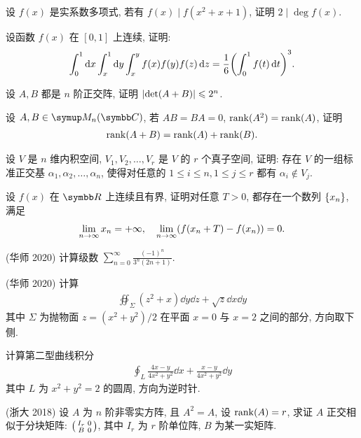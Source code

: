 \documentclass{ctexart}
\begin{document}
\begin{exercise}[resume=exer]
\begin{exercise}
        \end{exercise}
        \item 设 $ f(x) $ 是实系数多项式, 若有 $ f(x) \mid f(x^2 + x + 1) $, 证明 $ 2 \mid \deg f(x) $.
        \item 设函数 $ f(x) $ 在 $ [0, 1] $ 上连续, 证明:
        \begin{align*}
            \int_{0}^{1} \dd{x}\int_{x}^{1} \dd{y}\int_{x}^{y}f(x)f(y)f(z)\dd{z} = \frac{1}{6}\qty(\int_{0}^{1}f(t) \dd{t})^{3}.
        \end{align*}
        \item 设 $ A, B $ 都是 $ n $ 阶正交阵, 证明 $ \abs{\det(A+B)} \leqslant 2^{n} $.
        \item 设 $ A, B \in \MM[\C] $, 若 $ AB = BA = 0 $, $ \rank(A^{2}) = \rank(A) $, 证明
        \begin{align*}
            \rank(A+B) = \rank(A) + \rank(B).
        \end{align*}
        \item 设 $ V $ 是 $ n $ 维内积空间,  $ V_{1}, V_{2}, \dots, V_{r} $ 是 $ V $ 的 $ r $ 个真子空间, 证明: 存在 $ V $ 的一组标准正交基 $ \alpha_{1}, \alpha_{2}, \dots, \alpha_{n} $, 使得对任意的 $ 1 \le i \le n, 1\le j \le r $ 都有 $ \alpha_{i} \notin V_{j} $. 
        \item 设 $ f(x) $ 在 $ \R $ 上连续且有界, 证明对任意 $ T > 0 $, 都存在一个数列 $ \qty{x_{n}} $, 满足
        \begin{align*}
            \lim_{n \to \infty} x_{n} = +\infty, \quad \lim_{n \to \infty}(f(x_{n}+T) - f(x_{n})) = 0.
        \end{align*}
        \item (华师 2020) 计算级数 $ \sum_{n=0}^{\infty}\frac{(-1)^{n}}{3^{n}(2n+1)} $.
        \item (华师 2020) 计算
        \begin{align*}
            \oiint_{\Sigma} (z^{2}+x) \dd{y}\dd{z} + \sqrt{z} \dd{x}\dd{y}
        \end{align*}
        其中 $ \Sigma $ 为抛物面 $ z = (x^{2}+y^{2})/2 $ 在平面 $ x=0 $ 与 $ x=2 $ 之间的部分, 方向取下侧.
        \item 计算第二型曲线积分
        \begin{align*}
            \oint_{L} \frac{4x-y}{4x^{2}+y^{2}}\dd{x} + \frac{x-y}{4x^{2}+y^{2}}\dd{y}
        \end{align*}
        其中 $ L $ 为 $ x^{2} + y^{2} = 2 $ 的圆周, 方向为逆时针.
        \item (浙大 2018) 设 $ A $ 为 $ n $ 阶非零实方阵, 且 $ A^{2} = A $, 设 $ \rank(A) = r $, 求证 $ A $ 正交相似于分块矩阵: $ \smqty(I_{r} & 0 \\ B & 0) $, 其中 $ I_{r} $ 为 $ r $ 阶单位阵, $ B $ 为某一实矩阵.

\end{exercise}
\end{document}
